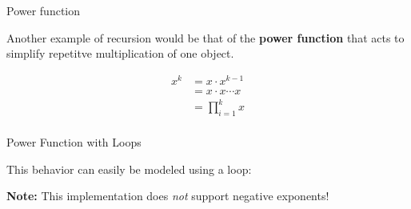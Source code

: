 \begin{frame}{Power function}

Another example of recursion would be that of the \textbf{power
function} that acts to simplify repetitve multiplication of one object.

\[\begin{aligned}
  {x^k} &= x \cdot {x^{k - 1}} \\
   &= x \cdot x \cdots x \\
   &= \prod\limits_{i = 1}^k x\\ 
\end{aligned} \]

\end{frame}

\begin{frame}[fragile]{Power Function with Loops}

This behavior can easily be modeled using a loop:

\begin{Shaded}
\begin{Highlighting}[]
\StringTok{ }
  
  \StringTok{ }               
  
    \StringTok{ }
  \NormalTok{\}}
  
\NormalTok{\}}
\end{Highlighting}
\end{Shaded}

\textbf{Note:} This implementation does \emph{not} support negative
exponents!

\end{frame}

